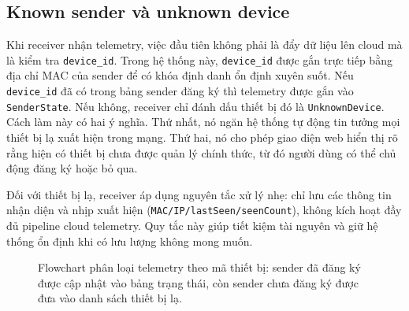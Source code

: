\documentclass[12pt,a4paper]{report}
\begin{document}
\subsection{Known sender và unknown device}
Khi receiver nhận telemetry, việc đầu tiên không phải là đẩy dữ liệu lên cloud mà là kiểm tra \texttt{device\_id}. Trong hệ thống này, \texttt{device\_id} được gắn trực tiếp bằng địa chỉ MAC của sender để có khóa định danh ổn định xuyên suốt. Nếu \texttt{device\_id} đã có trong bảng sender đăng ký thì telemetry được gắn vào \texttt{SenderState}. Nếu không, receiver chỉ đánh dấu thiết bị đó là \texttt{UnknownDevice}. Cách làm này có hai ý nghĩa. Thứ nhất, nó ngăn hệ thống tự động tin tưởng mọi thiết bị lạ xuất hiện trong mạng. Thứ hai, nó cho phép giao diện web hiển thị rõ rằng hiện có thiết bị chưa được quản lý chính thức, từ đó người dùng có thể chủ động đăng ký hoặc bỏ qua.

Đối với thiết bị lạ, receiver áp dụng nguyên tắc xử lý nhẹ: chỉ lưu các thông tin nhận diện và nhịp xuất hiện (\texttt{MAC/IP/lastSeen/seenCount}), không kích hoạt đầy đủ pipeline cloud telemetry. Quy tắc này giúp tiết kiệm tài nguyên và giữ hệ thống ổn định khi có lưu lượng không mong muốn.

\begin{figure}[H]
\centering
{}
\caption{Flowchart phân loại telemetry theo mã thiết bị: sender đã đăng ký được cập nhật vào bảng trạng thái, còn sender chưa đăng ký được đưa vào danh sách thiết bị lạ.}
\label{fig:known-unknown}
\end{figure}
\end{document}
